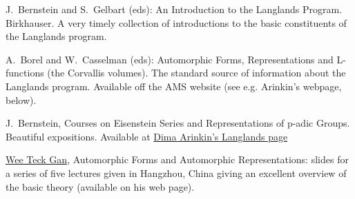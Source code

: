\documentclass[11pt,leqno]{article}
\theoremstyle{plain}
\theoremstyle{definition}
\numberwithin{equation}{section}
\numberwithin{lem}{section}
\begin{document}
{J.~Bernstein and S.~Gelbart (eds): An Introduction to the Langlands Program. Birkhauser. A very timely collection of introductions to the basic constituents of the Langlands program.

A.~Borel and W.~Casselman (eds): Automorphic Forms, Representations and L-functions (the Corvallis volumes). The standard source of information about the Langlands program. Available off the AMS website (see e.g. Arinkin's webpage, below).

J.~Bernstein, Courses on Eisenstein Series and Representations of p-adic Groups. Beautiful expositions. Available at \href{http://www.math.uchicago.edu/~arinkin/langlands}{Dima Arinkin's Langlands page}

\href{http://www.math.ucsd.edu/~wgan}{Wee Teck Gan}, Automorphic Forms and Automorphic Representations: slides for a series of five lectures given in Hangzhou, China giving an excellent overview of the basic theory (available on his web page).}





\end{document}
